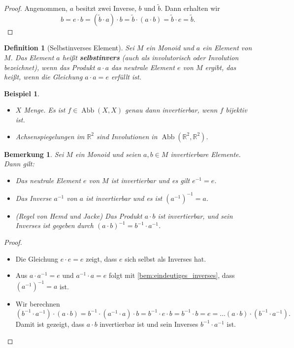\documentclass[a4paper, twoside, 11pt, ngerman]{report}
\DeclareMathOperator{\Abb}{Abb}
\theoremstyle{definistyle}
\newtheorem{defini}[satz]{Definition}
\newtheorem{bem}[satz]{Bemerkung}
\newtheorem{bsp}[satz]{Beispiel}
\theoremstyle{remark}
\newcommand{\defn}[1]{\textit{\bfseries #1}}
\begin{document}
\begin{proof}
Angenommen, $ a $ besitzt zwei Inverse, $ b $ und $\tilde b$. Dann erhalten wir
\[
b = e \cdot b = (\tilde b \cdot a)\cdot b = \tilde b\cdot ( a\cdot b) = \tilde b \cdot e = \tilde b.
\]
\end{proof}


\begin{defini}[Selbstinverses Element]\label{def:selbstinvers}
Sei $ M $ ein Monoid und $ a $ ein Element von $ M $. Das Element $ a $ heißt \defn{selbstinvers} (auch als involutorisch oder Involution bezeichnet), wenn das Produkt $ a \cdot a $ das neutrale Element $ e $ von $ M $ ergibt, das heißt, wenn die Gleichung $ a \cdot a = e $ erfüllt ist.
\end{defini}


\begin{bsp}\label{bsp:invertierbar_involutorisch}
\begin{itemize}
    \item[(a)] $ X $ Menge. Es ist $ f \in \Abb(X, X) $ genau dann invertierbar, wenn $ f $ bijektiv ist.
    \item[(b)] Achsenspiegelungen im $ \mathbb{R}^2 $ sind Involutionen in $ \Abb(\mathbb{R}^2, \mathbb{R}^2) $.
\end{itemize}
\end{bsp}

\begin{bem}\label{bem:invertierbare_elemente}
Sei $ M $ ein Monoid und seien $ a, b \in M $ invertierbare Elemente. Dann gilt:
\begin{itemize}
    \item[(a)] Das neutrale Element $ e $ von $ M $ ist invertierbar und es gilt $ e^{-1} = e $.
    \item[(b)] Das Inverse $a^{-1}$ von $ a $ ist invertierbar und es ist $(a^{-1})^{-1} = a $.
    \item[(c)] (Regel von Hemd und Jacke) Das Produkt $ a \cdot b $ ist invertierbar, und sein Inverses ist gegeben durch $ (a \cdot b)^{-1} = b^{-1} \cdot a^{-1} $.
\end{itemize}
\end{bem}

\begin{proof}
\begin{itemize}
    \item[(a)] Die Gleichung $ e \cdot e = e $ zeigt, dass $ e $ sich selbst als Inverses hat.
    \item[(b)] Aus $ a \cdot a^{-1} = e $ und $ a^{-1} \cdot a = e $ folgt mit \ref{bem:eindeutiges_inverses}, dass $ (a^{-1})^{-1} = a $ ist.
    \item[(c)] Wir berechnen
    \[
    (b^{-1} \cdot a^{-1}) \cdot (a \cdot b) = b^{-1} \cdot (a^{-1} \cdot a) \cdot b = b^{-1} \cdot e \cdot b = b^{-1} \cdot b = e = \ldots (a\cdot b)\cdot(b^{-1}\cdot a^{-1}).
    \]
    Damit ist gezeigt, dass $ a \cdot b $ invertierbar ist und sein Inverses $ b^{-1} \cdot a^{-1} $ ist.
\end{itemize}
\end{proof}
\end{document}
